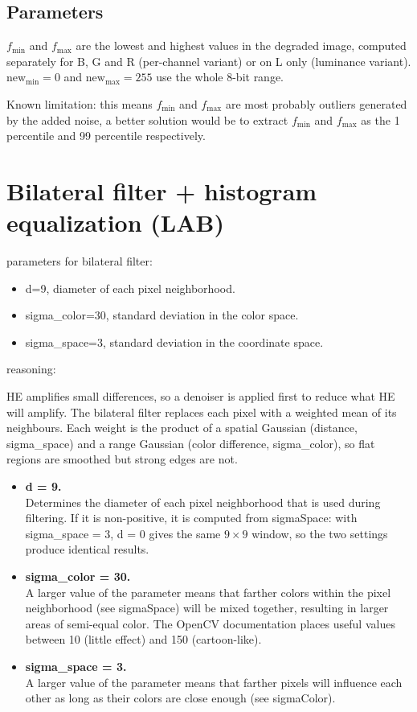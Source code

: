 \documentclass[11pt,a4paper]{article}
\begin{document}
\subsection{Parameters}

$f_{\min}$ and $f_{\max}$ are the lowest and highest values in the degraded image, computed separately for B, G and R (per-channel variant) or on L only (luminance variant). $\text{new}_{\min} = 0$ and $\text{new}_{\max} = 255$ use the whole 8-bit range.

Known limitation: this means $f_{\min}$ and $f_{\max}$ are most probably outliers generated by the added noise, a better solution would be to extract $f_{\min}$ and $f_{\max}$ as the 1 percentile and 99 percentile respectively.

\section{Bilateral filter + histogram equalization (LAB)}

parameters for bilateral filter:
\begin{itemize}
  \item d=9, diameter of each pixel neighborhood.
  \item sigma\_color=30, standard deviation in the color space.
  \item sigma\_space=3, standard deviation in the coordinate space.
\end{itemize}

reasoning:

HE amplifies small differences, so a denoiser is applied first to reduce what HE will amplify. The bilateral filter replaces each pixel with a weighted mean of its neighbours. Each weight is the product of a spatial Gaussian (distance, sigma\_space) and a range Gaussian (color difference, sigma\_color), so flat regions are smoothed but strong edges are not.

\begin{itemize}
  \item \textbf{d = 9.}\\
  Determines the diameter of each pixel neighborhood that is used during filtering. If it is non-positive, it is computed from sigmaSpace: with sigma\_space = 3, d = 0 gives the same $9\times9$ window, so the two settings produce identical results.
  \item \textbf{sigma\_color = 30.}\\
  A larger value of the parameter means that farther colors within the pixel neighborhood (see sigmaSpace) will be mixed together, resulting in larger areas of semi-equal color.
  The OpenCV documentation places useful values between 10 (little effect) and 150 (cartoon-like).
  \item \textbf{sigma\_space = 3.}\\
  A larger value of the parameter means that farther pixels will influence each other as long as their colors are close enough (see sigmaColor).
\end{itemize}
\end{document}
